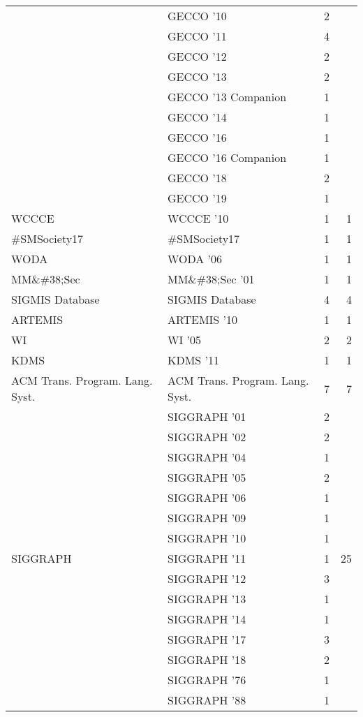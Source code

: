 \begin{table*}[t]
\begin{tabular}{llrr}
& GECCO '10 & 2 &\\
& GECCO '11 & 4 &\\
& GECCO '12 & 2 &\\
& GECCO '13 & 2 &\\
& GECCO '13 Companion & 1 &\\
& GECCO '14 & 1 &\\
& GECCO '16 & 1 &\\
& GECCO '16 Companion & 1 &\\
& GECCO '18 & 2 &\\
& GECCO '19 & 1 &\\
\multirow{1}{*}{WCCCE } & WCCCE '10 & 1 & \multirow{1}{*}{1}\\
\multirow{1}{*}{\#SMSociety17} & \#SMSociety17 & 1 & \multirow{1}{*}{1}\\
\multirow{1}{*}{WODA } & WODA '06 & 1 & \multirow{1}{*}{1}\\
\multirow{1}{*}{MM\&\#38;Sec } & MM\&\#38;Sec '01 & 1 & \multirow{1}{*}{1}\\
\multirow{1}{*}{SIGMIS Database} & SIGMIS Database & 4 & \multirow{1}{*}{4}\\
\multirow{1}{*}{ARTEMIS } & ARTEMIS '10 & 1 & \multirow{1}{*}{1}\\
\multirow{1}{*}{WI } & WI '05 & 2 & \multirow{1}{*}{2}\\
\multirow{1}{*}{KDMS } & KDMS '11 & 1 & \multirow{1}{*}{1}\\
\multirow{1}{*}{ACM Trans. Program. Lang. Syst.} & ACM Trans. Program. Lang. Syst. & 7 & \multirow{1}{*}{7}\\
\multirow{17}{*}{SIGGRAPH } & SIGGRAPH '01 & 2 & \multirow{17}{*}{25}\\
& SIGGRAPH '02 & 2 &\\
& SIGGRAPH '04 & 1 &\\
& SIGGRAPH '05 & 2 &\\
& SIGGRAPH '06 & 1 &\\
& SIGGRAPH '09 & 1 &\\
& SIGGRAPH '10 & 1 &\\
& SIGGRAPH '11 & 1 &\\
& SIGGRAPH '12 & 3 &\\
& SIGGRAPH '13 & 1 &\\
& SIGGRAPH '14 & 1 &\\
& SIGGRAPH '17 & 3 &\\
& SIGGRAPH '18 & 2 &\\
& SIGGRAPH '76 & 1 &\\
& SIGGRAPH '88 & 1 &\\

\end{tabular}
\end{table*}
